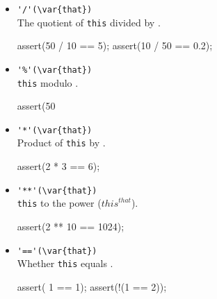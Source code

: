 \begin{itemize}
\item \lstinline|'/'(\var{that})|\\
  The quotient of \lstinline|this| divided by .
\begin{urbiscript}[firstnumber=last]
assert(50 / 10 == 5);
assert(10 / 50 == 0.2);
\end{urbiscript}

\item \lstinline|'%'(\var{that})|\\
  \lstinline|this| modulo .
\begin{urbiscript}[firstnumber=last]
assert(50 %
\end{urbiscript}

\item \lstinline|'*'(\var{that})|\\
  Product of \lstinline|this| by .
\begin{urbiscript}[firstnumber=last]
assert(2 * 3 == 6);
\end{urbiscript}

\item \lstinline|'**'(\var{that})|\\
  \lstinline|this| to the  power (${this}^{that}$).
\begin{urbiscript}[firstnumber=last]
assert(2 ** 10 == 1024);
\end{urbiscript}

\item \lstinline|'=='(\var{that})|\\
  Whether \lstinline|this| equals .
\begin{urbiscript}[firstnumber=last]
assert(  1 == 1);
assert(!(1 == 2));
\end{urbiscript}
\end{itemize}



